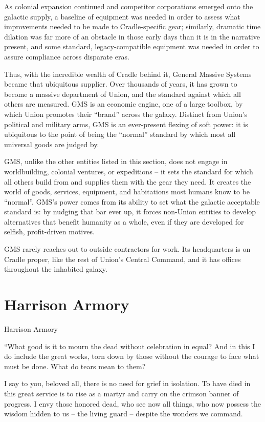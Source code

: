 As colonial expansion continued and competitor corporations emerged onto the galactic supply, a
baseline of equipment was needed in order to assess what improvements needed to be made to
Cradle-specific gear; similarly, dramatic time dilation was far more of an obstacle in those early
days than it is in the narrative present, and some standard, legacy-compatible equipment was
needed in order to assure compliance across disparate eras.




Thus, with the incredible wealth of Cradle behind it, General Massive Systems became that
ubiquitous supplier. Over thousands of years, it has grown to become a massive department of
Union, and the standard against which all others are measured. GMS is an economic engine, one
of a large toolbox, by which Union promotes their “brand” across the galaxy. Distinct from Union’s
political and military arms, GMS is an ever-present flexing of soft power: it is ubiquitous to the
point of being the “normal” standard by which most all universal goods are judged by.

GMS, unlike the other entities listed in this section, does not engage in worldbuilding, colonial
ventures, or expeditions -- it sets the standard for which all others build from and supplies them
with the gear they need. It creates the world of goods, services, equipment, and habitations most
humans know to be “normal”. GMS’s power comes from its ability to set what the galactic
acceptable standard is: by nudging that bar ever up, it forces non-Union entities to develop
alternatives that benefit humanity as a whole, even if they are developed for selfish, profit-driven
motives.

GMS rarely reaches out to outside contractors for work. Its headquarters is on Cradle proper, like
the rest of Union’s Central Command, and it has offices throughout the inhabited galaxy.
\section{Harrison Armory}
Harrison Armory

         “What good is it to mourn the dead without celebration in equal? And in this I do include the
         great works, torn down by those without the courage to face what must be done. What do
         tears mean to them?

         I say to you, beloved all, there is no need for grief in isolation. To have died in this great
         service is to rise as a martyr and carry on the crimson banner of progress. I envy those
         honored dead, who see now all things, who now possess the wisdom hidden to us -- the
         living guard -- despite the wonders we command.

